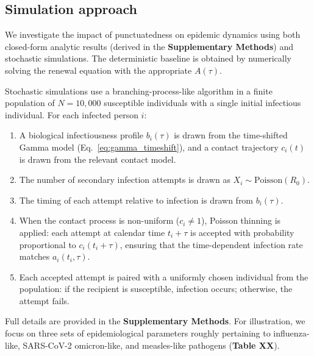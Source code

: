
\subsection{Simulation approach}

We investigate the impact of punctuatedness on epidemic dynamics using both closed-form analytic results (derived in the {\bf Supplementary Methods}) and stochastic simulations. The deterministic baseline is obtained by numerically solving the renewal equation with the appropriate $A(\tau)$.

Stochastic simulations use a branching-process-like algorithm in a finite population of $N = 10{,}000$ susceptible individuals with a single initial infectious individual. For each infected person $i$:
%
\begin{enumerate}
    \item A biological infectiousness profile $b_i(\tau)$ is drawn from the time-shifted Gamma model (Eq.~\ref{eq:gamma_timeshift}), and a contact trajectory $c_i(t)$ is drawn from the relevant contact model.
    \item The number of secondary infection attempts is drawn as $X_i \sim \text{Poisson}(R_0)$.
    \item The timing of each attempt relative to infection is drawn from $b_i(\tau)$.
    \item When the contact process is non-uniform ($c_i \neq 1$), Poisson thinning is applied: each attempt at calendar time $t_i + \tau$ is accepted with probability proportional to $c_i(t_i + \tau)$, ensuring that the time-dependent infection rate matches $a_i(t_i, \tau)$.
    \item Each accepted attempt is paired with a uniformly chosen individual from the population: if the recipient is susceptible, infection occurs; otherwise, the attempt fails.
\end{enumerate}
%
Full details are provided in the {\bf Supplementary Methods}. For illustration, we focus on three sets of epidemiological parameters roughly pertaining to influenza-like, SARS-CoV-2 omicron-like, and measles-like pathogens ({\bf Table XX}).
